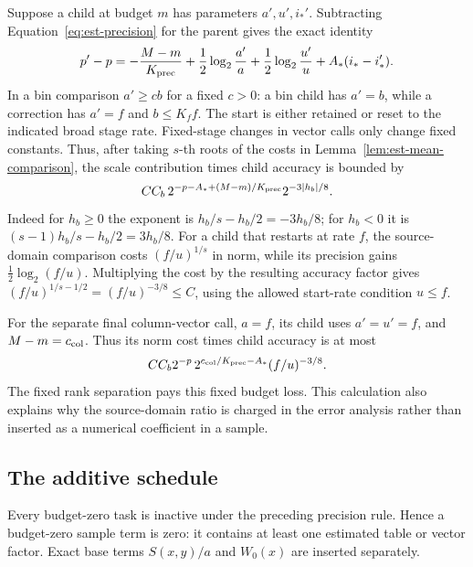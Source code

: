 Suppose a child at budget $m$ has parameters $a',u',i_*'$.  Subtracting
Equation~\eqref{eq:est-precision} for the parent gives the exact identity
\begin{equation}
 p'-p=-\frac{M-m}{K_{\rm prec}}
       +\frac12\log_2\frac{a'}a
       +\frac12\log_2\frac{u'}u
       +A_*(i_*-i_*').
 \label{eq:est-child-precision}
\end{equation}
In a bin comparison $a'\ge c b$ for a fixed $c>0$: a bin child has
$a'=b$, while a correction has $a'=f$ and $b\le K_f f$.
The start is either retained or reset to the indicated broad stage rate.
Fixed-stage changes in vector calls only change fixed constants.
Thus, after taking $s$-th roots of the costs in
Lemma~\ref{lem:est-mean-comparison}, the scale contribution times child
accuracy is bounded by
\begin{equation}
 C C_b\,2^{-p-A_*+(M-m)/K_{\rm prec}}
          2^{-3|h_b|/8}.
 \label{eq:est-scale-slack}
\end{equation}
Indeed for $h_b\ge0$ the exponent is $h_b/s-h_b/2=-3h_b/8$;
for $h_b<0$ it is $(s-1)h_b/s-h_b/2=3h_b/8$.
For a child that restarts at rate $f$, the source-domain comparison costs
$(f/u)^{1/s}$ in norm, while its precision gains
$\frac12\log_2(f/u)$.  Multiplying the cost by the resulting accuracy
factor gives
$(f/u)^{1/s-1/2}=(f/u)^{-3/8}\le C$, using the allowed start-rate
condition $u\le f$.

For the separate final column-vector call, $a=f$, its child uses
$a'=u'=f$, and $M-m=c_{\rm col}$.  Thus its norm cost times child
accuracy is at most
\[
 C C_b2^{-p}\,2^{c_{\rm col}/K_{\rm prec}-A_*}
       (f/u)^{-3/8}.
\]
The fixed rank separation pays this fixed budget loss.  This calculation
also explains why the source-domain ratio is charged in the error
analysis rather than inserted as a numerical coefficient in a sample.

\subsection{The additive schedule}

Every budget-zero task is inactive under the preceding precision rule.
Hence a budget-zero sample term is zero: it contains at least one
estimated table or vector factor.  Exact base terms $S(x,y)/a$ and
$W_0(x)$ are inserted separately.

